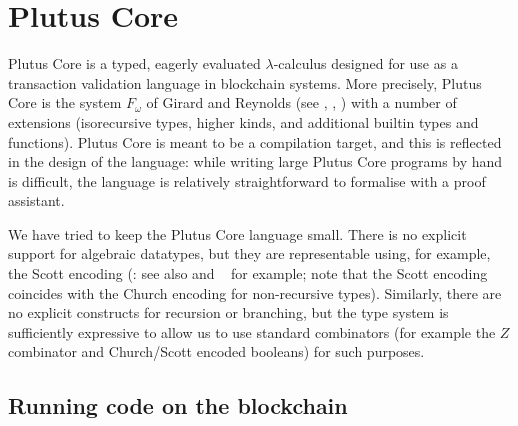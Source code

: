 \documentclass[a4paper]{article}
\begin{document}
%


\maketitle

\thispagestyle{plain}
\pagestyle{plain}



\section{Plutus Core}

Plutus Core is a typed, eagerly evaluated $\lambda$-calculus designed
for use as a transaction validation language in blockchain
systems. More precisely, Plutus Core is the system $F_\omega$ of
Girard and Reynolds (see \citep{Girard-thesis},
\citep{Reynolds-type-structure}, \citep[\S30]{Pierce:TAPL}) with a
number of extensions (isorecursive types, higher kinds, and additional
builtin types and functions).  Plutus Core is meant to be a
compilation target, and this is reflected in the design of the
language: while writing large Plutus Core programs by hand is
difficult, the language is relatively straightforward to formalise
with a proof assistant.

We have tried to keep the Plutus Core language small. There is no
explicit support for algebraic datatypes, but they are representable
using, for example, the Scott encoding (\citep{Scott-encoding}: see
also \citep{Koopman:2014} and ~\citep{Geuvers-2014} for example; note that
the Scott encoding coincides with the Church encoding for
non-recursive types). Similarly, there are no explicit constructs for
recursion or branching, but the type system is sufficiently expressive
to allow us to use standard combinators (for example the $Z$
combinator and Church/Scott encoded booleans) for such purposes.


\subsection{Running code on the blockchain}
\end{document}
